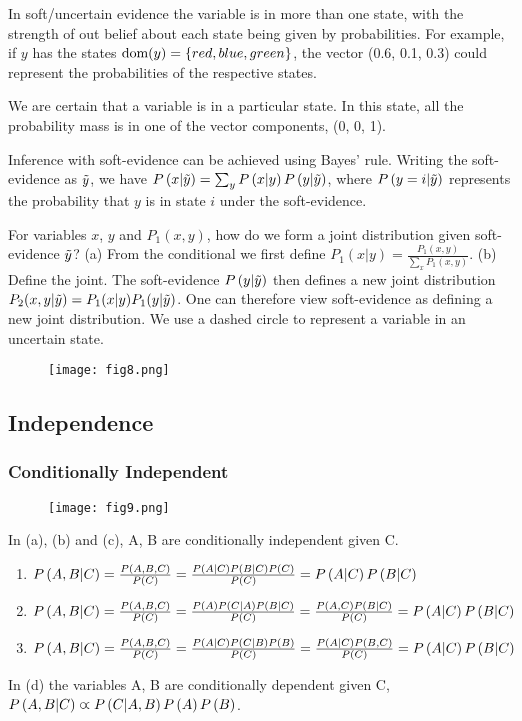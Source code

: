 \begin{description}[leftmargin=0cm]	
	\item[Definition] In soft/uncertain evidence the variable is in more than one state, with the strength of out belief about each state being given by probabilities. For example, if $y$ has the states $\dom(y)=\{red,blue,green\}$, the vector (0.6, 0.1, 0.3) could represent the probabilities of the respective states.
	\item[Hard Evidence] We are certain that a variable is in a particular state. In this state, all the probability mass is in one of the vector components, (0, 0, 1).
	\item[Inference] Inference with soft-evidence can be achieved using Bayes' rule. Writing the soft-evidence as $\ti{y}$, we have $\P{x|\ti{y}}=\sum_y\P{x|y}\P{y|\ti{y}}$, where $\P{y=i|\ti{y}}$ represents the probability that $y$ is in state $i$ under the soft-evidence.
	\item[Jeffrey's Rule] For variables $x$, $y$ and $P_1(x,y)$, how do we form a joint distribution given soft-evidence $\ti{y}$? (a) From the conditional we first define $P_1(x|y)=\frac{P_1(x,y)}{\sum_xP_1(x,y)}$. (b) Define the joint. The soft-evidence $\P{y|\ti{y}}$ then defines a new joint distribution $P_2(x,y|\ti{y})=P_1(x|y)P_1(y|\ti{y})$. One can therefore view soft-evidence as defining a new joint distribution. We use a dashed circle to represent a variable in an uncertain state.
		\begin{figure*}[h]
			\centering
			\texttt{[image: fig8.png]}
		\end{figure*}
\end{description}

\subsection{Independence}

\subsubsection*{Conditionally Independent}
\begin{figure*}[h]
	\centering
	\texttt{[image: fig9.png]}
\end{figure*}
In (a), (b) and (c), A, B are conditionally independent given C.
\begin{enumerate}[label=(\alph*)]
	\item $\P{A,B|C}=\frac{\P{A,B,C}}{\P{C}}=\frac{\P{A|C}\P{B|C}\P{C}}{\P{C}}=\P{A|C}\P{B|C}$
	\item $\P{A,B|C}=\frac{\P{A,B,C}}{\P{C}}=\frac{\P{A}\P{C|A}\P{B|C}}{\P{C}}=\frac{\P{A,C}\P{B|C}}{\P{C}}=\P{A|C}\P{B|C}$
	\item $\P{A,B|C}=\frac{\P{A,B,C}}{\P{C}}=\frac{\P{A|C}\P{C|B}\P{B}}{\P{C}}=\frac{\P{A|C}\P{B,C}}{\P{C}}=\P{A|C}\P{B|C}$
\end{enumerate}
In (d) the variables A, B are conditionally dependent given C, $\P{A,B|C}\prop\P{C|A,B}\P{A}\P{B}$.

